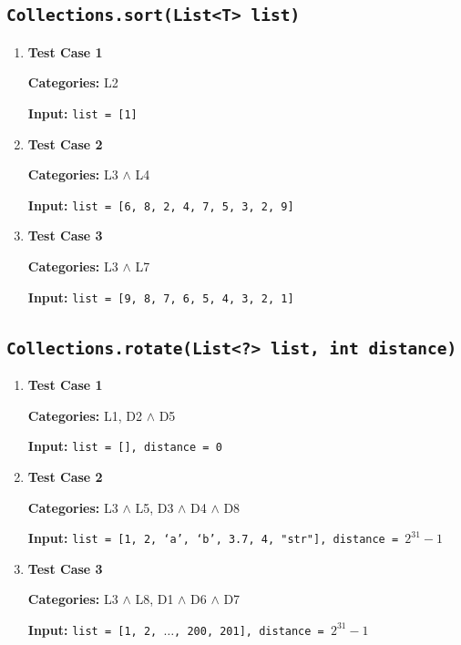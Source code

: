 \documentclass[12pt, a4paper]{article}
\begin{document}
\subsection{\texttt{Collections.sort(List<T> list)}}
\begin{enumerate}
  \item \textbf{Test Case 1}
  \par\quad\textbf{Categories:} L2

  \par\quad\textbf{Input:} \texttt{list = [1]}

  \item \textbf{Test Case 2}
  \par\quad\textbf{Categories:} L3 $\wedge$ L4

  \par\quad\textbf{Input:} \texttt{list = [6, 8, 2, 4, 7, 5, 3, 2, 9]}

  \item \textbf{Test Case 3}
  \par\quad\textbf{Categories:} L3 $\wedge$ L7
  \par\quad\textbf{Input:} \texttt{list = [9, 8, 7, 6, 5, 4, 3, 2, 1]}
\end{enumerate}

\subsection{\texttt{Collections.rotate(List<?> list, int distance)}}
\begin{enumerate}
  \item \textbf{Test Case 1}
  \par\quad\textbf{Categories:} L1, D2 $\wedge$ D5
  \par\quad\textbf{Input:} \texttt{list = [], distance = 0}

  \item \textbf{Test Case 2}
  \par\quad\textbf{Categories:} L3 $\wedge$ L5, D3 $\wedge$ D4 $\wedge$ D8
  \par\quad\textbf{Input:} \texttt{list = [1, 2, `a', `b', 3.7, 4, "str"], distance = $2^{31} - 1$}

  \item \textbf{Test Case 3}
  \par\quad\textbf{Categories:} L3 $\wedge$ L8, D1 $\wedge$ D6 $\wedge$ D7
  \par\quad\textbf{Input:} \texttt{list = [1, 2, $\dots$, 200, 201], distance = $2^{31} - 1$}
\end{enumerate}
\end{document}

